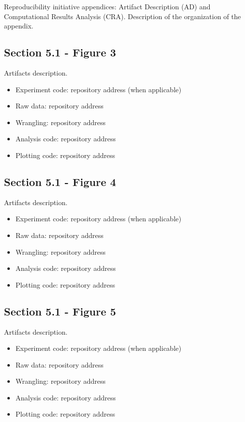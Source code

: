 Reproducibility initiative appendices: Artifact Description (AD) and Computational Results Analysis (CRA). Description of the organization of the appendix.

\subsection{Section 5.1 - Figure 3}
\label{apndx:fig3}

Artifacts description.

\begin{itemize}
    \item Experiment code: repository address (when applicable)
    \item Raw data: repository address
    \item Wrangling: repository address
    \item Analysis code: repository address
    \item Plotting code: repository address
\end{itemize}

\subsection{Section 5.1 - Figure 4}
\label{apndx:fig4}

Artifacts description.

\begin{itemize}
    \item Experiment code: repository address (when applicable)
    \item Raw data: repository address
    \item Wrangling: repository address
    \item Analysis code: repository address
    \item Plotting code: repository address
\end{itemize}

\subsection{Section 5.1 - Figure 5}
\label{apndx:fig5}

Artifacts description.

\begin{itemize}
    \item Experiment code: repository address (when applicable)
    \item Raw data: repository address
    \item Wrangling: repository address
    \item Analysis code: repository address
    \item Plotting code: repository address
\end{itemize}

